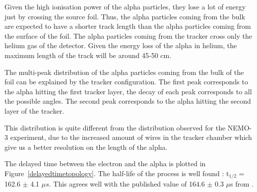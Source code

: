 \documentclass[main.tex]{subfiles}
\begin{document}
\FloatBarrier


\noindent Given the high ionisation power of the alpha particles, they lose a lot of energy just by crossing the source foil. Thus, the alpha particles coming from the bulk are expected to have a shorter track length than the alpha particles coming from the surface of the foil. The alpha particles coming from the tracker cross only the helium gas of the detector. Given the energy loss of the alpha in helium, the maximum length of the track will be around 45-50 cm.

\bigskip

\noindent The multi-peak distribution of the alpha particles coming from the bulk of the foil can be explained by the tracker configuration. The first peak corresponds to the alpha hitting the first tracker layer, the decay of each peak corresponds to all the possible angles. The second peak corresponds to the alpha hitting the second layer of the tracker.



\noindent This distribution is quite different from the distribution observed for the NEMO-3 experiment, due to the increased amount of wires in the tracker chamber which give us a better resolution on the length of the alpha. 


\bigskip


\noindent The delayed time between the electron and the alpha is plotted in Figure~\ref{delayedtimetopology}. The half-life of the process is well found : t$_{\text{1/2}}$ = 162.6 $\pm$ 4.1 $\mu s$. This agrees well with the published value of 164.6 $\pm$ 0.3 $\mu$s from \cite{NuclearDataSheet210}.
\end{document}
